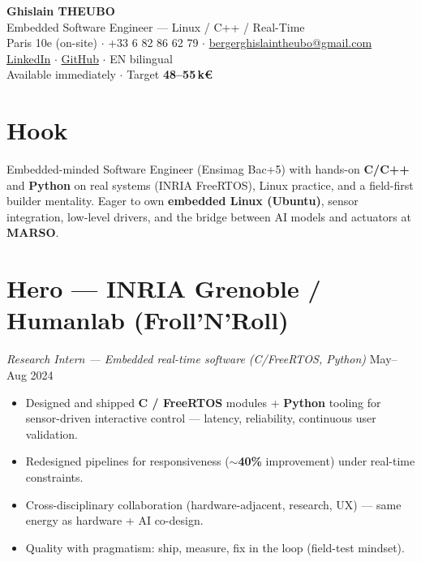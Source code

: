 \documentclass[10pt,a4paper]{article}
\begin{document}
\begin{center}
{\LARGE\bfseries Ghislain THEUBO}\\[1pt]
{\large Embedded Software Engineer --- Linux / C++ / Real-Time}\\[2pt]
Paris 10e (on-site) $\cdot$ +33 6 82 86 62 79 $\cdot$ \href{mailto:bergerghislaintheubo@gmail.com}{bergerghislaintheubo@gmail.com}\\
\href{https://www.linkedin.com/in/berger-ghislain}{LinkedIn} $\cdot$ \href{https://github.com/Bergerghislain}{GitHub} $\cdot$ EN bilingual\\
\small Available immediately $\cdot$ Target \textbf{48--55\,k€}
\end{center}

\section{Hook}
Embedded-minded Software Engineer (Ensimag Bac+5) with hands-on \textbf{C/C++} and \textbf{Python} on real systems (INRIA FreeRTOS), Linux practice, and a field-first builder mentality. Eager to own \textbf{embedded Linux (Ubuntu)}, sensor integration, low-level drivers, and the bridge between AI models and actuators at \textbf{MARSO}.

\section{Hero --- INRIA Grenoble / Humanlab (Froll'N'Roll)}
\textit{Research Intern --- Embedded real-time software (C/FreeRTOS, Python)} \hfill May--Aug 2024
\begin{itemize}
  \item Designed and shipped \textbf{C / FreeRTOS} modules + \textbf{Python} tooling for sensor-driven interactive control --- latency, reliability, continuous user validation.
  \item Redesigned pipelines for responsiveness (\textbf{$\sim$40\%} improvement) under real-time constraints.
  \item Cross-disciplinary collaboration (hardware-adjacent, research, UX) --- same energy as hardware + AI co-design.
  \item Quality with pragmatism: ship, measure, fix in the loop (field-test mindset).
\end{itemize}
\end{document}
